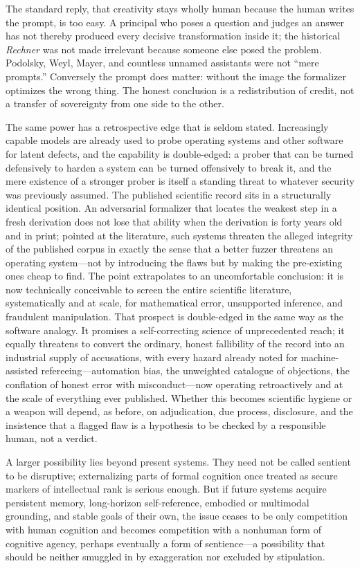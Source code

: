 \documentclass[
  aps,
  reprint,
  superscriptaddress,
  floatfix,
  nofootinbib,
  longbibliography
]{revtex4-2}
\begin{document}
The standard reply, that creativity stays wholly human because the human writes
the prompt, is too easy. A principal who poses a question and judges an answer
has not thereby produced every decisive transformation inside it; the historical
\emph{Rechner} was not made irrelevant because someone else posed the problem.
Podolsky, Weyl, Mayer, and countless unnamed assistants were not ``mere
prompts.'' Conversely the prompt does matter: without the image the formalizer
optimizes the wrong thing. The honest conclusion is a redistribution of credit,
not a transfer of sovereignty from one side to the other.

The same power has a retrospective edge that is seldom stated. Increasingly
capable models are already used to probe operating systems and other software
for latent defects, and the capability is double-edged: a prober that can be
turned defensively to harden a system can be turned offensively to break it, and
the mere existence of a stronger prober is itself a standing threat to whatever
security was previously assumed. The published scientific record sits in a
structurally identical position. An adversarial formalizer that locates the
weakest step in a fresh derivation does not lose that ability when the
derivation is forty years old and in print; pointed at the literature, such
systems threaten the alleged integrity of the published corpus in exactly the
sense that a better fuzzer threatens an operating system---not by introducing
the flaws but by making the pre-existing ones cheap to find. The point
extrapolates to an uncomfortable conclusion: it is now technically conceivable
to screen the entire scientific literature, systematically and at scale, for
mathematical error, unsupported inference, and fraudulent manipulation. That
prospect is double-edged in the same way as the software analogy. It promises a
self-correcting science of unprecedented reach; it equally threatens to convert
the ordinary, honest fallibility of the record into an industrial supply of
accusations, with every hazard already noted for machine-assisted
refereeing---automation bias, the unweighted catalogue of objections, the
conflation of honest error with misconduct---now operating retroactively and at
the scale of everything ever published. Whether this becomes scientific hygiene
or a weapon will depend, as before, on adjudication, due process, disclosure,
and the insistence that a flagged flaw is a hypothesis to be checked by a
responsible human, not a verdict.

A larger possibility lies beyond present systems. They need not be called
sentient to be disruptive; externalizing parts of formal cognition once treated
as secure markers of intellectual rank is serious enough. But if future systems
acquire persistent memory, long-horizon self-reference, embodied or multimodal
grounding, and stable goals of their own, the issue ceases to be only competition
with human cognition and becomes competition with a nonhuman form of cognitive
agency, perhaps eventually a form of sentience---a possibility that should be
neither smuggled in by exaggeration nor excluded by stipulation.
\end{document}
